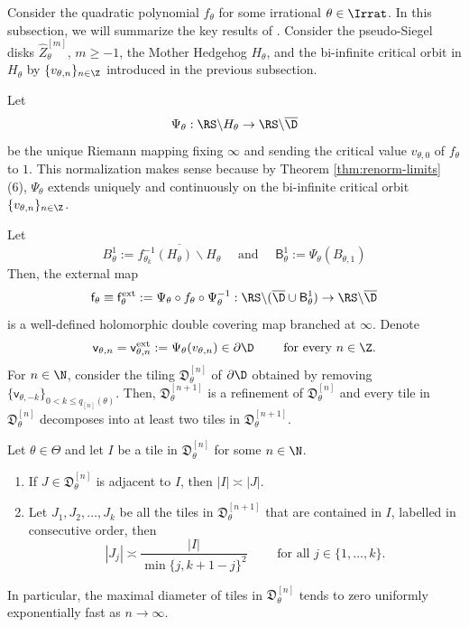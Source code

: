 \documentclass{amsart}
\begin{document}
Consider the quadratic polynomial $f_\theta$ for some irrational $\theta \in \Irrat$.
In this subsection, we will summarize the key results of \cite{DLi26}.
Consider the pseudo-Siegel disks $\hat{Z}^{[m]}_{\theta}$, $m \geq -1$, the Mother Hedgehog $H_\theta$, and the bi-infinite critical orbit in $H_\theta$ by $\{v_{\theta,n}\}_{n\in\Z}$ introduced in the previous subsection.

Let
\[
    \Psi_{\theta} : \RS \backslash H_{\theta} \to \RS \backslash \overline{\D}
\]
be the unique Riemann mapping fixing $\infty$ and sending the critical value $v_{\theta,0}$ of $f_{\theta}$ to $1$.
This normalization makes sense because by Theorem \ref{thm:renorm-limits} (6), $\Psi_{\theta}$ extends uniquely and continuously on the bi-infinite critical orbit $\{v_{\theta,n}\}_{n \in \Z}$.

Let 
\[
    B_{\theta}^1 := \overline{f_{\theta_k}^{-1}(H_{\theta})\backslash H_{\theta}}
    \quad \text{ and } \quad
    \mathsf{B}_{\theta}^1 := \Psi_\theta(B_{\theta,1})
\]
Then, the external map
\[
    \mathsf{f}_\theta \equiv 
    \mathsf{f}_\theta^{\textnormal{ext}} 
    := \Psi_\theta \circ f_\theta \circ \Psi_\theta^{-1} : 
    \RS \backslash ( \overline{\D} \cup \mathsf{B}_{\theta}^1) \to \RS \backslash \overline{\D}
\]
is a well-defined holomorphic double covering map branched at $\infty$.
Denote 
\[
\mathsf{v}_{\theta,n} = \mathsf{v}_{\theta,n}^{\textnormal{ext}}
:= \Psi_{\theta}(v_{\theta,n}) \in \partial \D
\qquad \text{ for every }
n \in \Z.
\]
For $n \in \N$, consider the tiling $\mathfrak{D}_{\theta}^{[n]}$ of $\partial \D$ obtained by removing $\{ \mathsf{v}_{\theta,-k} \}_{0<k\leq q_{[n]}(\theta)}$. 
Then, $\mathfrak{D}_{\theta}^{[n+1]}$ is a refinement of $\mathfrak{D}_{\theta}^{[n]}$ and every tile in $\mathfrak{D}_{\theta}^{[n]}$ decomposes into at least two tiles in $\mathfrak{D}_{\theta}^{[n+1]}$.

\begin{theorem}
\label{thm:R-APB}
    Let $\theta \in \Theta$ and let $I$ be a tile in $\mathfrak{D}_{\theta}^{[n]}$ for some $n \in \N$.
    \begin{enumerate}
        \item If $J \in \mathfrak{D}_{\theta}^{[n]}$ is adjacent to $I$, then $|I| \asymp |J|$.
        \item Let $J_1,J_2,\ldots,J_k$ be all the tiles in $\mathfrak{D}_{\theta}^{[n+1]}$ that are contained in $I$, labelled in consecutive order, then
        \[
            |J_j| \asymp \frac{|I|}{\min\{j, k+1-j\}^2} \qquad \text{ for all } j \in \{1,\ldots,k\}.
        \]
    \end{enumerate}
    In particular, the maximal diameter of tiles in $\mathfrak{D}_{\theta}^{[n]}$ tends to zero uniformly exponentially fast as $n \to \infty$.
\end{theorem}
\end{document}
